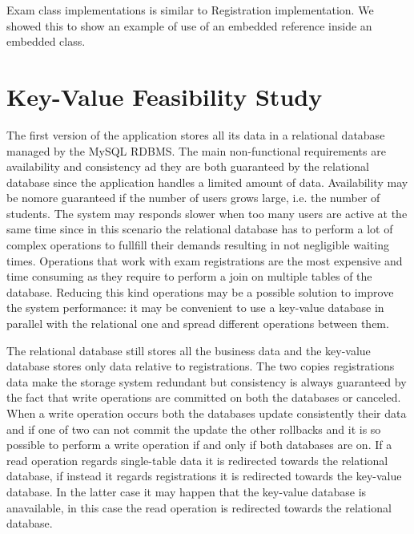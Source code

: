 \documentclass{report}
\begin{document}
Exam class implementations is similar to Registration implementation. We showed this to show an example of use of an embedded reference inside an embedded class.



\chapter*{Key-Value Feasibility Study}
The first version of the application stores all its data in a relational database managed by the MySQL RDBMS.
The main non-functional requirements are availability and consistency ad they are both guaranteed by the relational database since the application handles a limited amount of data.
Availability may be nomore guaranteed if the number of users grows large, i.e. the number of students. The system may responds slower when too many users are active at the same time since in this scenario the relational database has to perform a lot of complex operations to fullfill their demands resulting in not negligible waiting times. \linebreak
Operations that work with exam registrations are the most expensive and time consuming as they require to perform a join on multiple tables of the database. Reducing this kind operations may be a possible solution to improve the system performance: it may be convenient to use a key-value database in parallel with the relational one and spread different operations between them. \linebreak

The relational database still stores all the business data and the key-value database stores only data relative to registrations. The two copies registrations data make the storage system redundant but consistency is always guaranteed by the fact that write operations are committed on both the databases or canceled.
When a write operation occurs both the databases update consistently their data and if one of two can not commit the update the other rollbacks and it is so possible to perform a write operation if and only if both databases are on.
If a read operation regards single-table data it is redirected towards the relational database, if instead it regards registrations it is redirected towards the key-value database. In the latter case it may happen that the key-value database is anavailable, in this case the read operation is redirected towards the relational database. \linebreak 
\end{document}
